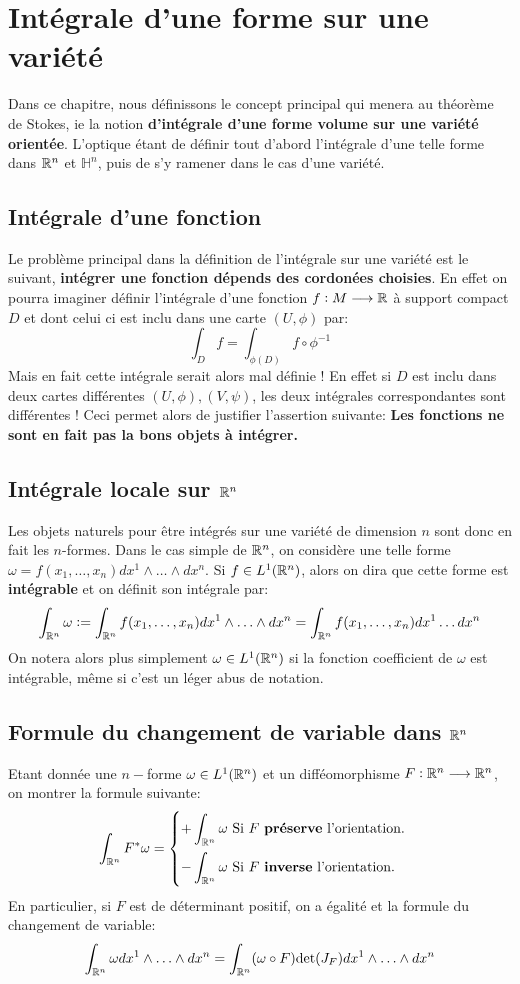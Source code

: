 \chapter{Intégrale d'une forme sur une variété}
Dans ce chapitre, nous définissons le concept principal qui menera au théorème de Stokes, ie la notion \textbf{d'intégrale d'une forme volume sur une variété orientée}. L'optique étant de définir tout d'abord l'intégrale d'une telle forme dans \( \mathbb{R}^n \) et \( \mathbb{H}^n \), puis de s'y ramener dans le cas d'une variété.
\section{Intégrale d'une fonction}
Le problème principal dans la définition de l'intégrale sur une variété est le suivant, \textbf{intégrer une fonction dépends des cordonées choisies}. En effet on pourra imaginer définir l'intégrale d'une fonction \( f : M \longrightarrow \mathbb{R} \) à support compact \( D \) et dont celui ci est inclu dans une carte \((U, \phi)\) par:
\[ 
   \int_D f = \int_{\phi(D)} f  \circ \phi^{-1} 
\] 
Mais en fait cette intégrale serait alors mal définie ! En effet si \( D \) est inclu dans deux cartes différentes \( (U, \phi), (V, \psi) \), les deux intégrales correspondantes sont différentes ! Ceci permet alors de justifier l'assertion suivante: \textbf{Les fonctions ne sont en fait pas la bons objets à intégrer.}
\section{Intégrale locale sur \( \mathbb{R}^n \)}
Les objets naturels pour être intégrés sur une variété de dimension \( n \) sont donc en fait les \(n\)-formes. Dans le cas simple de \( \mathbb{R}^n \), on considère une telle forme \(\omega = f(x_1, \ldots, x_n) dx^1 \wedge \ldots \wedge dx^n\). Si \( f \in L^1(\mathbb{R}^n) \), alors on dira que cette forme est \textbf{intégrable} et on définit son intégrale par: 
\[ 
   \int_{\mathbb{R}^n} \omega := \int_{\mathbb{R}^n} f(x_1, \ldots, x_n)dx^1 \wedge \ldots \wedge dx^n = \int_{\mathbb{R}^n} f(x_1, \ldots, x_n)dx^1\ldots dx^n
\]
On notera alors plus simplement \(\omega \in L^1(\mathbb{R}^n)\) si la fonction coefficient de \( \omega \) est intégrable, même si c'est un léger abus de notation.
\section{Formule du changement de variable dans \( \mathbb{R}^n \)}
Etant donnée une \( n-\)forme \( \omega \in L^1(\mathbb{R}^n) \) et un difféomorphisme \( F : \mathbb{R}^n \longrightarrow \mathbb{R}^n \), on montrer la formule suivante:
\[ 
   \int_{\R^n} F^*\omega = 
   \begin{cases}
      \displaystyle+\int_{\R^n} \omega \text{ Si $F$ \textbf{préserve} l'orientation.}\vspace{5pt}\\
      \displaystyle-\int_{\R^n} \omega \text{ Si $F$ \textbf{inverse} l'orientation.}
   \end{cases}
\]
En particulier, si \( F \) est de déterminant positif, on a égalité et la formule du changement de variable:
\[ 
   \int_{\mathbb{R}^n} \omega dx^1 \wedge \ldots \wedge dx^n = \int_{\mathbb{R}^n} (\omega \circ F) \text{det}(J_F) dx^1 \wedge \ldots \wedge dx^n
\]
